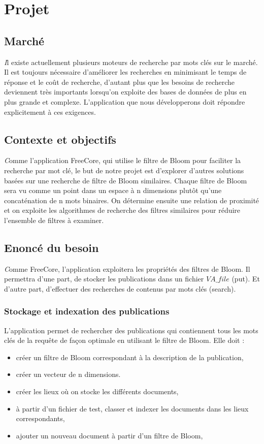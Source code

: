 \chapter{Projet}
\section{Marché}
		{\huge \itshape I}l existe actuellement plusieurs moteurs de recherche par mots clés sur le marché. Il est toujours nécessaire d’améliorer les recherches en minimisant le temps de réponse et le coût de recherche, d’autant plus que les besoins de recherche deviennent très importants lorsqu’on exploite des bases de données de plus en plus grande et complexe. L’application que nous développerons doit répondre explicitement à ces exigences.
		
	\section{Contexte et objectifs}
		{\huge \itshape C}omme l’application FreeCore\cite{freecore}, qui utilise le filtre de Bloom pour faciliter la recherche par mot clé, le but de notre projet est d'explorer d’autres solutions basées sur une recherche de filtre de Bloom similaires.  Chaque filtre  de  Bloom  sera vu  comme  un  point  dans  un  espace à n dimensions  plutôt  qu'une  concaténation de  n mots binaires. On détermine ensuite une relation de proximité et on exploite les algorithmes de recherche des filtres similaires pour réduire l'ensemble de filtres à examiner.
		
	\section{Enoncé du besoin}
		{\huge \itshape C}omme FreeCore, l’application exploitera les propriétés des filtres de Bloom. Il  permettra d’une part, de stocker les publications dans un fichier $VA\_file$ (put). Et d’autre part, d’effectuer des recherches de contenus par mots clés (search).
	\subsection{Stockage et indexation des publications}
	L’application permet de rechercher des publications qui contiennent tous les mots clés de la requête de façon optimale en utilisant le filtre de Bloom. Elle doit :
	\begin{itemize}
	
	\item créer un filtre de Bloom correspondant à la description de la publication, 
	\item créer un vecteur de n dimensions.
	\item créer les lieux où on stocke les différents documents,
	\item à partir d'un fichier de test, classer et indexer les documents dans les lieux correspondants,		
	\item ajouter un nouveau document à partir d'un filtre de Bloom,				\end{itemize}
	
